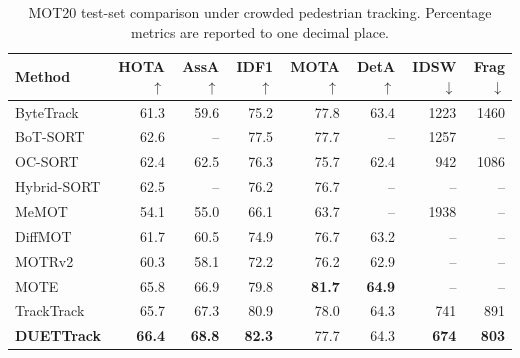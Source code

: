\documentclass[a4paper,fleqn]{cas-sc}
\begin{document}
\begin{table}[pos=!ht]
\centering
\caption{MOT20 test-set comparison under crowded pedestrian tracking. Percentage metrics are reported to one decimal place.}
\label{tab:mot20}
{\footnotesize
\begin{tabular*}{\textwidth}{@{\extracolsep{\fill}}lrrrrrrr@{}}
\toprule
Method & HOTA$\uparrow$ & AssA$\uparrow$ & IDF1$\uparrow$ & MOTA$\uparrow$ & DetA$\uparrow$ & IDSW$\downarrow$ & Frag$\downarrow$ \\
\midrule
ByteTrack \cite{zhang2022bytetrack} & 61.3 & 59.6 & 75.2 & 77.8 & 63.4 & 1223 & 1460 \\
BoT-SORT \cite{aharon2022bot} & 62.6 & -- & 77.5 & 77.7 & -- & 1257 & -- \\
OC-SORT \cite{cao2023observation} & 62.4 & 62.5 & 76.3 & 75.7 & 62.4 & 942 & 1086 \\
Hybrid-SORT \cite{yang2024hybrid} & 62.5 & -- & 76.2 & 76.7 & -- & -- & -- \\
MeMOT \cite{cai2022memot} & 54.1 & 55.0 & 66.1 & 63.7 & -- & 1938 & -- \\
DiffMOT \cite{lv2024diffmot} & 61.7 & 60.5 & 74.9 & 76.7 & 63.2 & -- & -- \\
MOTRv2 \cite{zhang2023motrv2} & 60.3 & 58.1 & 72.2 & 76.2 & 62.9 & -- & -- \\
MOTE \cite{galoaa2025more} & 65.8 & 66.9 & 79.8 & \textbf{81.7} & \textbf{64.9} & -- & -- \\
TrackTrack \cite{shim2025focusing} & 65.7 & 67.3 & 80.9 & 78.0 & 64.3 & 741 & 891 \\
\midrule
\textbf{DUETTrack} & \textbf{66.4} & \textbf{68.8} & \textbf{82.3} & 77.7 & 64.3 & \textbf{674} & \textbf{803} \\
\bottomrule
\end{tabular*}}
\end{table}
\end{document}
